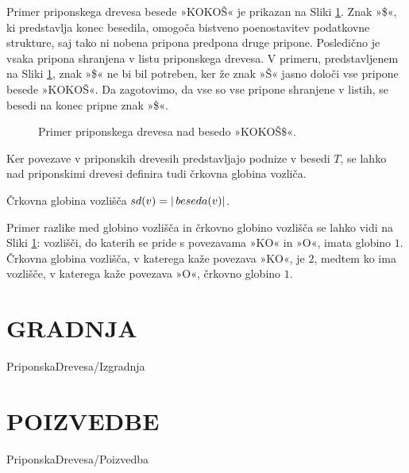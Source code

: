 
Primer priponskega drevesa besede »KOKOŠ« je prikazan na Sliki \ref{fig:PriponskoDrevo}. Znak »\$«, ki predstavlja konec besedila, omogoča bistveno poenostavitev podatkovne strukture, saj tako ni nobena pripona predpona druge pripone. Posledično je vsaka pripona shranjena v listu priponskega drevesa. V primeru, predstavljenem na Sliki \ref{fig:PriponskoDrevo}, znak »\$« ne bi bil potreben, ker že znak »Š« jasno določi vse pripone besede »KOKOŠ«. Da zagotovimo, da vse so vse pripone shranjene v listih, se besedi na konec pripne znak »\$«.

\begin{figure}[htb]
    \begin{center}
        
        \caption{Primer priponskega drevesa nad besedo »KOKOŠ$\$$«.} 
        \label{fig:PriponskoDrevo}
    \end{center}
\end{figure}


%
%
Ker povezave v priponskih drevesih predstavljajo podnize v besedi $T$, se lahko nad priponskimi drevesi definira tudi črkovna globina vozliča.



\begin{defi}
    Črkovna globina vozlišča $ \mathop{sd}(v) =| \mathop{beseda}(v)|$.
\end{defi}

Primer razlike med globino vozlišča in črkovno globino vozlišča se lahko vidi na Sliki \ref{fig:PriponskoDrevo}: vozlišči, do katerih se pride s povezavama »KO« in »O«, imata globino $1$. Črkovna globina vozlišča, v katerega kaže povezava »KO«, je $2$, medtem ko ima vozlišče, v katerega kaže povezava »O«, črkovno globino $1$. 

\section{GRADNJA}\label{sec:izgradnja}
{PriponskaDrevesa/Izgradnja}

\section{POIZVEDBE}\label{sec:poizvedba}
{PriponskaDrevesa/Poizvedba}